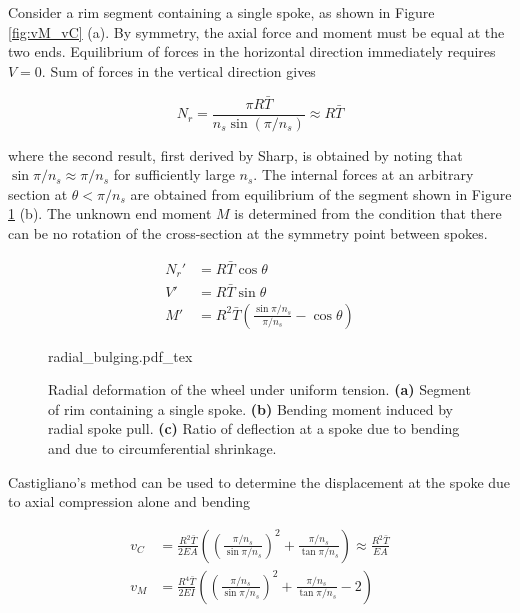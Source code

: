 \documentclass[../thesis.tex]{subfiles}
\begin{document}
Consider a rim segment containing a single spoke, as shown in Figure \ref{fig:vM_vC} (a). By symmetry, the axial force and moment must be equal at the two ends. Equilibrium of forces in the horizontal direction immediately requires $V=0$. Sum of forces in the vertical direction gives

\begin{equation}
\label{eq:Nr}
N_r = \frac{\pi R\bar{T}}{n_s\sin{(\pi/n_s)}} \approx R\bar{T}
\end{equation}

where the second result, first derived by Sharp\cite{Sharp}, is obtained by noting that $\sin{\pi/n_s}\approx \pi/n_s$ for sufficiently large $n_s$. The internal forces at an arbitrary section at $\theta < \pi/n_s$ are obtained from equilibrium of the segment shown in Figure \ref{fig:radial_bulging} (b). The unknown end moment $M$ is determined from the condition that there can be no rotation of the cross-section at the symmetry point between spokes.

\begin{subequations}
\begin{align}
\label{eq:NVM}
N_r' &= R\bar{T}\cos{\theta}\\
V'   &= R\bar{T}\sin{\theta}\\
M'   &= R^2\bar{T} \left( \frac{\sin{\pi/n_s}}{\pi/n_s} - \cos{\theta} \right)
\end{align}
\end{subequations}

\begin{figure}
\label{fig:radial_bulging}
\centering
{}
{radial_bulging.pdf_tex}
\caption{Radial deformation of the wheel under uniform tension. \textbf{(a)} Segment of rim containing a single spoke. \textbf{(b)} Bending moment induced by radial spoke pull. \textbf{(c)} Ratio of deflection at a spoke due to bending and due to circumferential shrinkage.}
\end{figure}

Castigliano's method can be used to determine the displacement at the spoke due to axial compression alone and bending

\begin{align}
v_C &= \frac{R^2\bar{T}}{2EA} \left( \left(\frac{\pi/n_s}{\sin{\pi/n_s}}\right)^2 +
    \frac{\pi/n_s}{\tan{\pi/n_s}}\right)
    \approx \frac{R^2\bar{T}}{EA}\label{eq:vC}\\
v_M &= \frac{R^4\bar{T}}{2EI} \left( \left(\frac{\pi/n_s}{\sin{\pi/n_s}}\right)^2 +
    \frac{\pi/n_s}{\tan{\pi/n_s}} - 2\right)\label{eq:vM}
\end{align}
\end{document}
